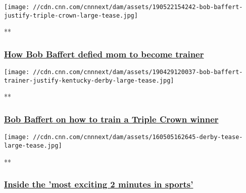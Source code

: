 \texttt{[image: //cdn.cnn.com/cnnnext/dam/assets/190522154242-bob-baffert-justify-triple-crown-large-tease.jpg]}

**

\hypertarget{how-bob-baffert-defied-mom-to-become-trainer}{%
\subsubsection{\texorpdfstring{\href{/videos/sports/2019/05/17/bob-baffert-horse-trainer-kentucky-derby-triple-crown-silver-charm-winning-post-vision-spt-intl.cnn}{How
Bob Baffert defied mom to become
trainer}}{How Bob Baffert defied mom to become trainer}}\label{how-bob-baffert-defied-mom-to-become-trainer}}

\href{/videos/sports/2019/06/03/bob-baffert-top-tips-triple-crown-winning-horse-winning-post-vision-spt-intl-lon-orig.cnn}{}

\texttt{[image: //cdn.cnn.com/cnnnext/dam/assets/190429120037-bob-baffert-trainer-justify-kentucky-derby-large-tease.jpg]}

**

\hypertarget{bob-baffert-on-how-to-train-a-triple-crown-winner}{%
\subsubsection{\texorpdfstring{\href{/videos/sports/2019/06/03/bob-baffert-top-tips-triple-crown-winning-horse-winning-post-vision-spt-intl-lon-orig.cnn}{Bob
Baffert on how to train a Triple Crown
winner}}{Bob Baffert on how to train a Triple Crown winner}}\label{bob-baffert-on-how-to-train-a-triple-crown-winner}}

\href{/videos/sports/2016/05/04/kentucky-derby-explainer-natsot-pkg-orig.cnn}{}

\texttt{[image: //cdn.cnn.com/cnnnext/dam/assets/160505162645-derby-tease-large-tease.jpg]}

**

\hypertarget{inside-the-most-exciting-2-minutes-in-sports}{%
\subsubsection{\texorpdfstring{\href{/videos/sports/2016/05/04/kentucky-derby-explainer-natsot-pkg-orig.cnn}{Inside
the 'most exciting 2 minutes in
sports'}}{Inside the 'most exciting 2 minutes in sports'}}\label{inside-the-most-exciting-2-minutes-in-sports}}

\href{/videos/sports/2019/03/22/gran-premio-latinoamericano-explainer-chile-2019-winning-post-vision-spt-intl.cnn}{}

